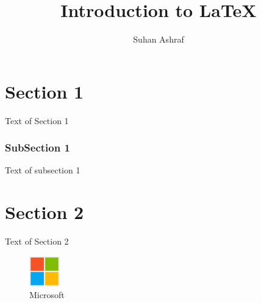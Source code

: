 \documentclass{report}
\begin{document}
    \title{Introduction to \LaTeX{}}
    \author{Suhan Ashraf}

    \maketitle

    \tableofcontents

    \chapter{Section 1}
	Text of Section 1
	\subsection{SubSection 1}
	Text of subsection 1
	\chapter{Section 2}
	Text of Section 2
    \begin{figure}[h]
        \includegraphics[width=50px]{Microsoft_logo.png}
        \centering
        \caption{Microsoft}
    \end{figure}
\end{document}
